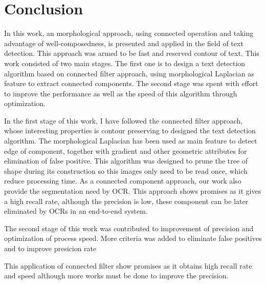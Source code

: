 
\graphicspath{ {7chapterConclusion/image/} }
\chapter{Conclusion}


In this work, an morphological approach, using connected operation and taking advantage of well-composedness, is presented and applied in the field of text detection. This approach was armed to be fast and reserved contour of text. This work consisted of two main stages. The first one is to design a text detection algorithm based on connected filter approach, using morphological Laplacian as feature to extract connected components. The second stage was spent with effort to improve the performance as well as the speed of this algorithm through optimization. 

In the first stage of this work, I have followed the connected filter approach, whose interesting properties is contour preserving to designed the text detection algorithm. The morphological Laplacian has been used as main feature to detect edge of component, together with gradient and other geometric attributes for elimination of false positive. This algorithm was designed to prune the tree of shape during its construction so this images only need to be read once, which reduce processing time. As a connected component approach, our work also provide the segmentation need by OCR. This approach shows promises as it gives a high recall rate, although the precision is low, these component can be later eliminated by OCRs in an end-to-end system.
  

The second stage of this work was contributed to improvement of precision and optimization of process speed. More criteria was added to eliminate false positives and to improve presicion rate 

This application of connected filter show promises as it obtains high recall rate and speed although more works must be done to improve the precision. 

 


